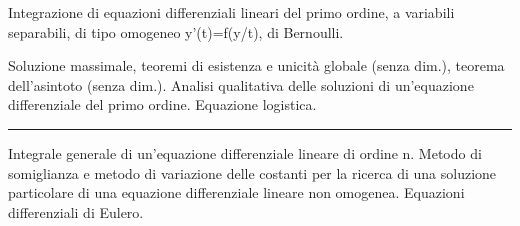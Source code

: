 \documentclass[a4paper,10pt]{article} %
\begin{document}
\begin{multicols}{2}
Integrazione di equazioni differenziali lineari del primo ordine,  a variabili separabili,  di tipo omogeneo y’(t)=f(y/t), di Bernoulli.

Soluzione massimale, teoremi di esistenza e unicità globale (senza dim.), teorema dell'asintoto (senza dim.). Analisi qualitativa delle soluzioni di un'equazione differenziale del primo ordine. Equazione logistica.






\bigbreak
\hrule
\bigbreak



Integrale generale di un'equazione differenziale lineare di ordine n. Metodo di somiglianza e metodo di variazione delle costanti per la ricerca di una soluzione particolare di una equazione differenziale lineare non omogenea. Equazioni differenziali di Eulero.

\end{multicols}
\end{document}
